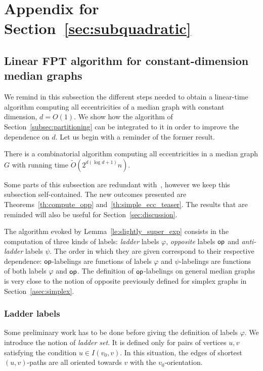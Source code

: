 \documentclass[a4paper,UKenglish,numberwithinsect,cleveref, autoref]{lipics-v2021}
\newcommand{\opp}{\mbox{\textsf{op}}}
\begin{document}
\section{Appendix for Section~\ref{sec:subquadratic}} \label{asec:subquadratic}

\subsection{Linear FPT algorithm for constant-dimension median graphs} \label{asubsec:constant_dim}

We remind in this subsection the different steps needed to obtain a linear-time algorithm computing all eccentricities of a median graph with constant dimension, $d=O(1)$. We show how the algorithm of Section~\ref{subsec:partitioning} can be integrated to it in order to improve the dependence on $d$. Let us begin with a reminder of the former result.

\begin{lemma}
There is a combinatorial algorithm computing all eccentricities in a median graph $G$ with running time $\tilde{O}(2^{d(\log d + 1)}n)$.
\label{le:slightly_super_exp}
\end{lemma}

Some parts of this subsection are redundant with~\cite{BeHa21}, however we keep this subsection self-contained. The new outcomes presented are Theorems~\ref{th:compute_opp} and~\ref{th:simple_ecc_teaser}. The results that are reminded will also be useful for Section~\ref{sec:discussion}.

The algorithm evoked by Lemma~\ref{le:slightly_super_exp} consists in the computation of three kinds of labels: \textit{ladder} labels $\varphi$, \textit{opposite} labels $\opp$ and \textit{anti-ladder} labels $\psi$. The order in which they are given correspond to their respective dependence: $\opp$-labelings are functions of labels $\varphi$ and $\psi$-labelings are functions of both labels $\varphi$ and $\opp$.
The definition of $\opp$-labelings on general median graphs is very close to the notion of opposite previously defined for simplex graphs in Section~\ref{asec:simplex}.

\subsubsection{Ladder labels} \label{subsubsec:ladder}

Some preliminary work has to be done before giving the definition of labels $\varphi$. We introduce the notion of \textit{ladder set}. It is defined only for pairs of vertices $u,v$ satisfying the condition $u \in I(v_0,v)$. In this situation, the edges of shortest $(u,v)$-paths are all oriented towards $v$ with the $v_0$-orientation.
\end{document}
